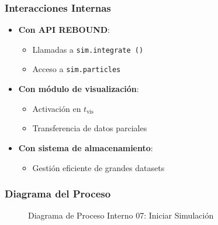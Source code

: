 \subsubsection{Interacciones Internas}
\begin{itemize}
    \item \textbf{Con API REBOUND}:
    \begin{itemize}
        \item Llamadas a \texttt{sim.integrate~()}
        \item Acceso a \texttt{sim.particles}
    \end{itemize}
    \item \textbf{Con módulo de visualización}:
    \begin{itemize}
        \item Activación en $t_{\text{vis}}$
        \item Transferencia de datos parciales
    \end{itemize}
    \item \textbf{Con sistema de almacenamiento}:
    \begin{itemize}
        \item Gestión eficiente de grandes datasets
    \end{itemize}
\end{itemize}
\newpage
\subsubsection{Diagrama del Proceso}
\begin{figure}[H]
    \centering
        \caption{Diagrama de Proceso Interno 07: Iniciar Simulación}%
    \label{fig:process_diagram07}
\end{figure}
\newpage
